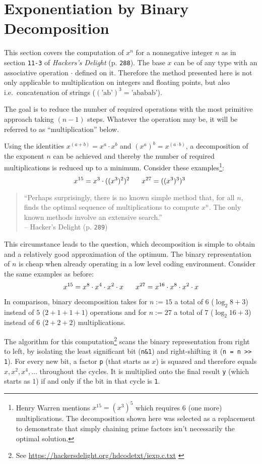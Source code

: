\section{Exponentiation by Binary Decomposition}\label{sec:decomposition}
This section covers the computation of $x^n$ for a nonnegative integer $n$
as in section \texttt{11-3} of \emph{Hackers's Delight}
\cite{Warren:2012:HD:2462741} (p. \texttt{288}).
The base $x$ can be of any type
with an associative operation $\cdot$ defined on it.
Therefore the method presented here
is not only applicable to multiplication on integers and floating points,
but also i.e.\ concatenation of strings
($(\text{'ab'})^3 = \text{'ababab'}$).

The goal is to reduce the number of required operations
with the most primitive approach taking $(n-1)$ steps.
Whatever the operation may be,
it will be referred to as ``multiplication'' below.

Using the identities $x^{(a+b)} = x^a \cdot x^b$
and $(x^a)^b = x^{(a \cdot b)}$,
a decomposition of the exponent $n$ can be achieved
and thereby the number of required multiplications is reduced up to a minimum.
Consider these examples\footnote{
Henry Warren \cite{Warren:2012:HD:2462741} mentions $x^{15} = (x^3)^5$
which requires 6 (one more) multiplications.
The decomposition shown here was selected as a replacement to demonstrate that
simply chaining prime factors isn't necessarily the optimal solution.
}:
\[ x^{15} = x^3 \cdot ((x^3)^2)^2 \hspace{4ex} x^{27} = ((x^3)^3)^3 \]

\begin{quotation}\noindent
``Perhaps surprisingly, there is no known simple method that, for all $n$,
finds the optimal sequence of multiplications to compute $x^n$.
The only known methods involve an extensive search.''\\
\phantom{a} \hfill -- Hacker's Delight
\cite{Warren:2012:HD:2462741} (p. \texttt{289})
\end{quotation}

This circumstance leads to the question, which decomposition
is simple to obtain and a relatively good approximation of the optimum.
The binary representation of $n$ is cheap
when already operating in a low level coding environment.
Consider the same examples as before:
\[ x^{15} = x^8 \cdot x^4 \cdot x^2 \cdot x \hspace{4ex}
x^{27} = x^{16} \cdot x^8 \cdot x^2 \cdot x \]

In comparison, binary decomposition takes
for $n := 15$ a total of $6$ ($\log_2 8 + 3$)
instead of $5$ ($2 + 1 + 1 + 1$) operations
and for $n := 27$ a total of $7$ ($\log_2 16 + 3$)
instead of $6$ ($2 + 2 + 2$) multiplications.

The algorithm for this computation\footnote{
See \url{https://hackersdelight.org/hdcodetxt/iexp.c.txt}
\cite{Warren:HD:Website}
} scans the binary representation from right to left,
by isolating the least significant bit (\lstinline$n&1$)
and right-shifting it (\lstinline$n = n >> 1$).
For every new bit, a factor \lstinline$p$ (that starts as $x$)
is squared and therefore equals $x, x^2, x^4, \dots$ throughout the cycles.
It is multiplied onto the final result \lstinline$y$ (which starts as $1$)
if and only if the bit in that cycle is \lstinline$1$.
